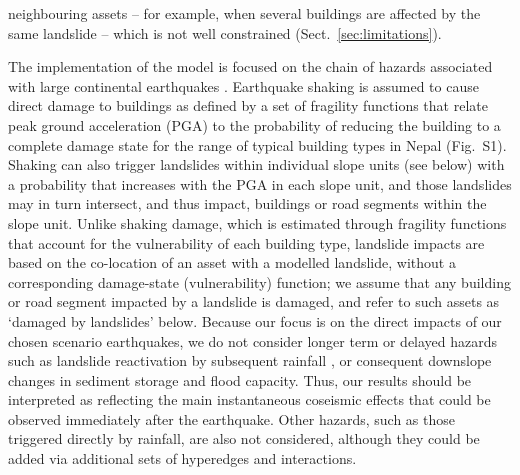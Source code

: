 \documentclass[nhess, manuscript]{copernicus}
\begin{document}
neighbouring assets -- for example, when several buildings are affected by the same landslide -- which is not well constrained (Sect.~\ref{sec:limitations}).

The implementation of the model is focused on the chain of hazards associated with large continental earthquakes \citep{Fan2019}. Earthquake shaking is assumed to cause direct damage to buildings as defined by a set of fragility functions that relate peak ground acceleration (PGA) to the probability of reducing the building to a complete damage state for the range of typical building types in Nepal (Fig.~S1). Shaking can also trigger landslides within individual slope units (see below) with a probability that increases with the PGA in each slope unit, and those landslides may in turn intersect, and thus impact, buildings or road segments within the slope unit. Unlike shaking damage, which is estimated through fragility functions that account for the vulnerability of each building type, landslide impacts are based on the co-location of an asset with a modelled landslide, without a corresponding damage-state (vulnerability) function; we assume that any building or road segment impacted by a landslide is damaged, and refer to such assets as `damaged by landslides' below. Because our focus is on the direct impacts of our chosen scenario earthquakes, we do not consider longer term or delayed hazards such as landslide reactivation by subsequent rainfall \citep{Fan2019,Kincey2021}, or consequent downslope changes in sediment storage and flood capacity. Thus, our results should be interpreted as reflecting the main instantaneous coseismic effects that could be observed immediately after the earthquake. Other hazards, such as those triggered directly by rainfall, are also not considered, although they could be added via additional sets of hyperedges and interactions.
\end{document}

